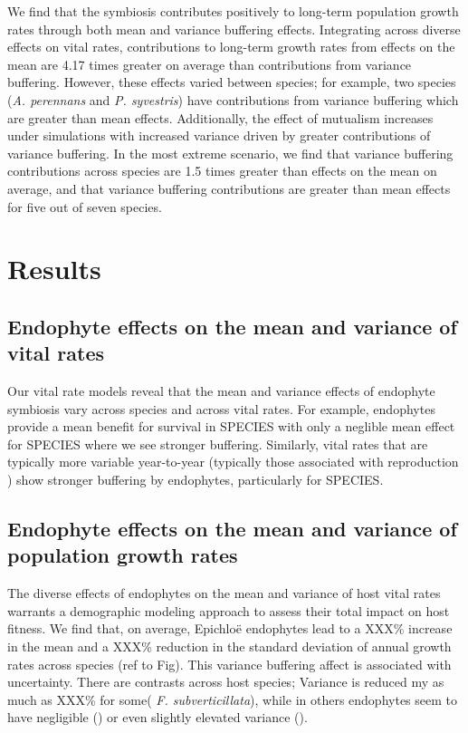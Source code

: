 \documentclass[9pt,twocolumn,twoside,lineno]{pnas-new}
\begin{document}
We find that the symbiosis contributes positively to long-term population growth rates through both mean and variance buffering effects. Integrating across diverse effects on vital rates, contributions to long-term growth rates from effects on the mean are 4.17 times greater on average than contributions from variance buffering. However, these effects varied between species; for example, two species (\emph{A. perennans} and \emph{P. syvestris}) have contributions from variance buffering which are greater than mean effects. Additionally, the effect of mutualism increases under simulations with increased variance driven by greater contributions of variance buffering. In the most extreme scenario, we find that variance buffering contributions across species are 1.5 times greater than effects on the mean on average, and that variance buffering contributions are greater than mean effects for five out of seven species.

\section*{Results}
\subsection*{Endophyte effects on the mean and variance of vital rates}
Our vital rate models reveal that the mean and variance effects of endophyte symbiosis vary across species and across vital rates. For example, endophytes provide a mean benefit for survival in SPECIES with only a neglible mean effect for SPECIES where we see stronger buffering. Similarly, vital rates that are typically more variable year-to-year (typically those associated with reproduction \cite{}) show stronger buffering by endophytes, particularly for SPECIES. 
\subsection*{Endophyte effects on the mean and variance of population growth rates}
The diverse effects of endophytes on the mean and variance of host vital rates warrants a demographic modeling approach to assess their total impact on host fitness. We find that, on average, Epichlo\"{e} endophytes lead to a XXX\% increase in the mean and a XXX\% reduction in the standard deviation of annual growth rates across species (ref to Fig). This variance buffering affect is associated with uncertainty. There are contrasts across host species; Variance is reduced my as much as XXX\% for some( \emph{F. subverticillata}), while in others endophytes seem to have negligible (\emph{}) or even slightly elevated variance (\emph{}).
\end{document}
